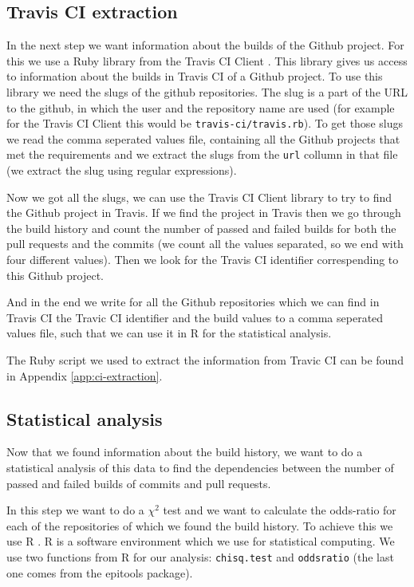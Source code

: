 \documentclass[a4paper,11pt]{article}
\begin{document}
		\subsection{Travis CI extraction}
			In the next step we want information about the builds of the Github project.
			For this we use a Ruby library from the Travis CI Client \cite{travis.rb}.
			This library gives us access to information about the builds in Travis CI of a Github project.
			To use this library we need the slugs of the github repositories.
			The slug is a part of the URL to the github, in which the user and the repository name are used (for example for the
			Travis CI Client this would be \texttt{travis-ci/travis.rb}).
			To get those slugs we read the comma seperated values file, containing all the Github projects that met the
			requirements and we extract the slugs from the \texttt{url} collumn in that file (we extract the slug using regular
			expressions).
			
			Now we got all the slugs, we can use the Travis CI Client library to try to find the Github project in Travis.
			If we find the project in Travis then we go through the build history and count the number of passed and failed
			builds for both the pull requests and the commits (we count all the values separated, so we end with four different
			values).
			Then we look for the Travis CI identifier correspending to this Github project.
			
			And in the end we write for all the Github repositories which we can find in Travis CI the Travic CI identifier and
			the build values to a comma seperated values file, such that we can use it in R for the statistical analysis.
			
			The Ruby script we used to extract the information from Travic CI can be found in Appendix \ref{app:ci-extraction}.
	
		\subsection{Statistical analysis}
			Now that we found information about the build history, we want to do a statistical analysis of this data to find
			the dependencies between the number of passed and failed builds of commits and pull requests.
			
			In this step we want to do a $\chi^2$ test and we want to calculate the odds-ratio for each of the repositories of
			which we found the build history.
			To achieve this we use R \cite{r}.
			R is a software environment which we use for statistical computing.
			We use two functions from R for our analysis: 
			\texttt{chisq.test} and \texttt{oddsratio} (the last one comes from the epitools package).
			
\end{document}
